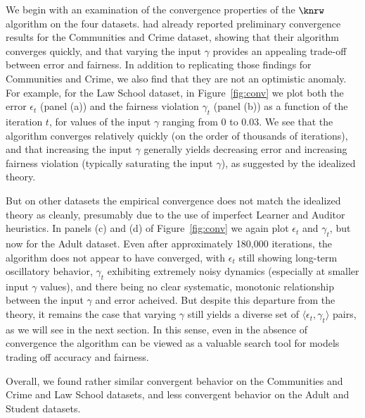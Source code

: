 We begin with an examination of the convergence properties of the $\knrw$ algorithm on the four datasets.
\citet{KNRW18} had already reported preliminary convergence results for the Communities and Crime dataset,
showing that their algorithm converges quickly, and that varying the input $\gamma$ provides an appealing trade-off between
error and fairness.
In addition to replicating those findings for Communities and Crime,
we also find that they are not an optimistic anomaly.
For example, for the Law School dataset, in Figure~\ref{fig:conv} %
we plot both the error $\epsilon_t$ (panel (a)) and the fairness violation
$\gamma_t$ (panel (b)) as a function of the iteration $t$, for values of the input $\gamma$ ranging from 0 to 0.03.
We see that the algorithm converges relatively quickly (on the
order of thousands of iterations), and that
increasing the input $\gamma$ generally yields decreasing error and increasing fairness violation (typically saturating
the input $\gamma$), as suggested
by the idealized theory.

But on other datasets the empirical convergence does not match the idealized theory as cleanly, presumably due to the
use of imperfect Learner and Auditor heuristics. In panels (c) and (d) of Figure~\ref{fig:conv} we again plot $\epsilon_t$
and $\gamma_t$, but now for the Adult dataset. Even after approximately 180,000 iterations, the algorithm does not appear
to have converged, with $\epsilon_t$ still showing long-term oscillatory behavior, $\gamma_t$ exhibiting extremely noisy
dynamics (especially at smaller input $\gamma$ values), and there being no clear systematic, monotonic relationship between
the input $\gamma$ and error acheived. But despite this departure from the theory, it remains the case that varying $\gamma$
still yields a diverse set of $\langle \epsilon_t, \gamma_t \rangle$ pairs, as we will see in the next section.
In this sense, even in the absence of convergence
the algorithm can be viewed as a valuable search tool for models trading off accuracy and fairness.

Overall, we found rather similar convergent behavior on the Communities and Crime and Law School datasets, and
less convergent behavior on the Adult and Student datasets.


